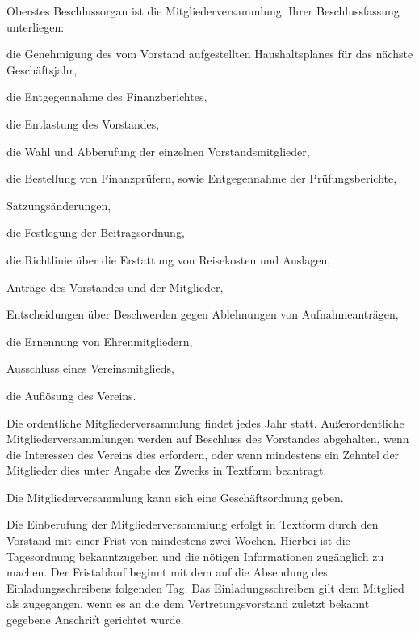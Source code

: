 \documentclass[draft]{scrartcl}
\begin{document}
\begin{contract}
\label{Mitgliederversammlung}

Oberstes Beschlussorgan ist die Mitgliederversammlung. Ihrer Beschlussfassung
unterliegen:

\begin{compactenum}[\hspace{2em}1.]
  \item die Genehmigung des vom Vorstand aufgestellten Haushaltsplanes für das
    näch\-ste Geschäftsjahr,
  \item die Entgegennahme des Finanzberichtes,
  \item die Entlastung des Vorstandes,
  \item die Wahl und Abberufung der einzelnen Vorstandsmitglieder,
  \item die Bestellung von Finanzprüfern, sowie Entgegennahme der
    Prüfungsberichte,
  \item Satzungsänderungen,
  \item die Festlegung der Beitragsordnung,
  \item die Richtlinie über die Erstattung von Reisekosten und Auslagen,
  \item Anträge des Vorstandes und der Mitglieder,
  \item Entscheidungen über Beschwerden gegen Ablehnungen von
    Aufnahmeanträgen,
  \item die Ernennung von Ehrenmitgliedern,
  \item Ausschluss eines Vereinsmitglieds,
  \item die Auf\/lösung des Vereins.
\end{compactenum}

Die ordentliche Mitgliederversammlung findet jedes Jahr statt. Außerordentliche
Mitgliederversammlungen werden auf Beschluss des Vorstandes abgehalten, wenn die
Interessen des Vereins dies erfordern, oder wenn mindestens ein Zehntel der
Mitglieder dies unter Angabe des Zwecks in Textform beantragt.

Die Mitgliederversammlung kann sich eine Geschäftsordnung geben.


Die Einberufung der Mitgliederversammlung erfolgt in Textform durch den
Vorstand mit einer Frist von mindestens zwei Wochen. Hierbei ist die
Tagesordnung bekanntzugeben und die nötigen Informationen zugänglich zu
machen. Der Fristablauf beginnt mit dem auf die Absendung des
Einladungsschreibens folgenden Tag. Das Einladungsschreiben gilt dem Mitglied
als zugegangen, wenn es an die dem Vertretungsvorstand zuletzt bekannt
gegebene Anschrift gerichtet wurde.


\end{contract}
\end{document}
